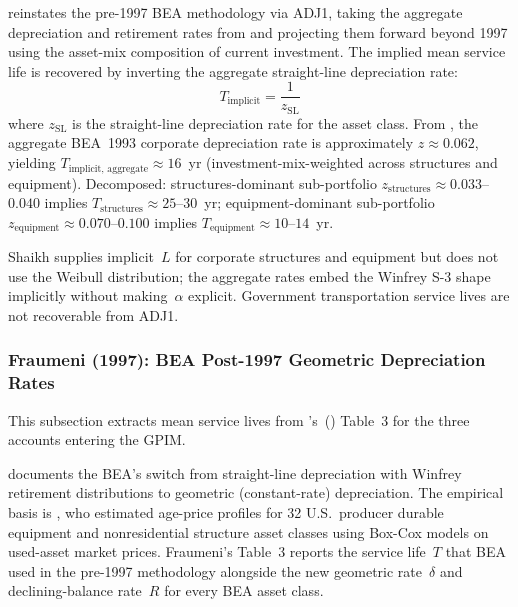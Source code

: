 \citet[Appendix~6.7]{Shaikh2016} reinstates the pre-1997 BEA methodology via
ADJ1, taking the aggregate depreciation and retirement rates from
\citet{BEA1993} and projecting them forward beyond 1997 using the asset-mix
composition of current investment. The implied mean service life is recovered by
inverting the aggregate straight-line depreciation rate:
%
\begin{equation}
    T_{\text{implicit}} = \frac{1}{z_{\text{SL}}}
    \label{eq:ret:shaikh_inversion}
\end{equation}
%
where $z_{\text{SL}}$ is the straight-line depreciation rate for the asset class.
From \citet[Appendix Figure~6.7.5]{Shaikh2016}, the aggregate BEA~1993 corporate
depreciation rate is approximately $z \approx 0.062$, yielding
$T_{\text{implicit, aggregate}} \approx 16$~yr (investment-mix-weighted across
structures and equipment). Decomposed: structures-dominant sub-portfolio
$z_{\text{structures}} \approx 0.033$--$0.040$ implies
$T_{\text{structures}} \approx 25$--$30$~yr; equipment-dominant sub-portfolio
$z_{\text{equipment}} \approx 0.070$--$0.100$ implies
$T_{\text{equipment}} \approx 10$--$14$~yr.

Shaikh supplies implicit~$L$ for corporate structures and equipment but does not
use the Weibull distribution; the aggregate rates embed the Winfrey S-3 shape
implicitly without making~$\alpha$ explicit. Government transportation service
lives are not recoverable from ADJ1.


\subsubsection{Fraumeni (1997): BEA Post-1997 Geometric Depreciation Rates}
\label{app:ret:src_fraumeni}

This subsection extracts mean service lives from
\citeauthor{Fraumeni1997}'s~(\citeyear{Fraumeni1997}) Table~3 for the three
accounts entering the GPIM.

\citet{Fraumeni1997} documents the BEA's switch from straight-line depreciation
with Winfrey retirement distributions to geometric (constant-rate) depreciation.
The empirical basis is \citet{HultenWykoff1981b}, who estimated age-price
profiles for 32 U.S.\ producer durable equipment and nonresidential structure
asset classes using Box-Cox models on used-asset market prices. Fraumeni's
Table~3 reports the service life~$T$ that BEA used in the pre-1997 methodology
alongside the new geometric rate~$\delta$ and declining-balance rate~$R$ for
every BEA asset class.


